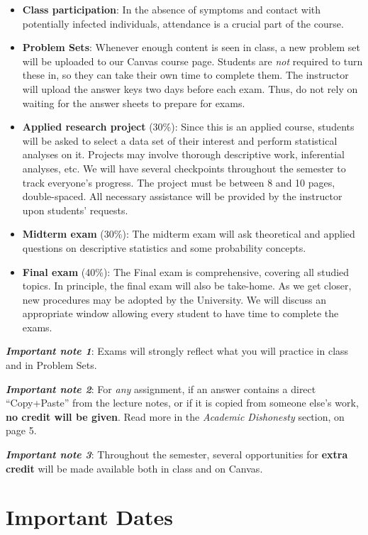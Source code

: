 \documentclass[11pt,]{article}
\begin{document}
\begin{itemize}
\item
  \textbf{Class participation}: In the absence of symptoms and contact
  with potentially infected individuals, attendance is a crucial part of
  the course.
\item
  \textbf{Problem Sets}: Whenever enough content is seen in class, a new
  problem set will be uploaded to our Canvas course page. Students are
  \emph{not} required to turn these in, so they can take their own time
  to complete them. The instructor will upload the answer keys two days
  before each exam. Thus, do not rely on waiting for the answer sheets
  to prepare for exams.
\item
  \textbf{Applied research project} (30\%): Since this is an applied
  course, students will be asked to select a data set of their interest
  and perform statistical analyses on it. Projects may involve thorough
  descriptive work, inferential analyses, etc. We will have several
  checkpoints throughout the semester to track everyone's progress. The
  project must be between 8 and 10 pages, double-spaced. All necessary
  assistance will be provided by the instructor upon students' requests.
\item
  \textbf{Midterm exam} (30\%): The midterm exam will ask theoretical
  and applied questions on descriptive statistics and some probability
  concepts.
\item
  \textbf{Final exam} (40\%): The Final exam is comprehensive, covering
  all studied topics. In principle, the final exam will also be
  take-home. As we get closer, new procedures may be adopted by the
  University. We will discuss an appropriate window allowing every
  student to have time to complete the exams.
\end{itemize}

\textbf{\emph{Important note 1}}: Exams will strongly reflect what you
will practice in class and in Problem Sets.

\textbf{\emph{Important note 2}}: For \emph{any} assignment, if an
answer contains a direct ``Copy+Paste'' from the lecture notes, or if it
is copied from someone else's work, \textbf{no credit will be given}.
Read more in the \emph{Academic Dishonesty} section, on page 5.

\textbf{\emph{Important note 3}}: Throughout the semester, several
opportunities for \textbf{extra credit} will be made available both in
class and on Canvas.

\hypertarget{important-dates}{%
\section{Important Dates}\label{important-dates}}
\end{document}
